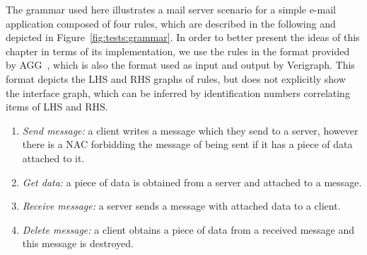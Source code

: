 
\begin{example} %
  The grammar used here illustrates a mail server scenario for a simple e-mail application composed of four rules, which are described in the following and depicted in Figure~\ref{fig:tests:grammar}.
  In order to better present the ideas of this chapter in terms of its implementation, we use the rules in the format provided by AGG~\cite{Taentzer2000}, which is also the format used as input and output by Verigraph.
  This format depicts the LHS and RHS graphs of rules, but does not explicitly show the interface graph, which can be inferred by identification numbers correlating items of LHS and RHS.

\begin{enumerate}[label=(\alph*),start=1]
  \item \emph{Send message:} a client writes a message which they send to a server, however there is a NAC forbidding the message of being sent if it has a piece of data attached to it.
  \item \emph{Get data:} a piece of data is obtained from a server and attached to a message.
  \item \emph{Receive message:} a server sends a message with attached data to a client.
  \item \emph{Delete message:} a client obtains a piece of data from a received message and this message is destroyed.
\end{enumerate}
\end{example}
%

